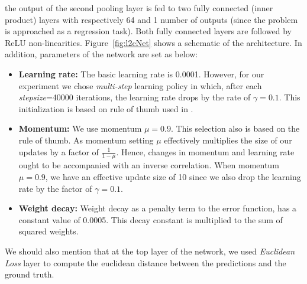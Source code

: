 \noindent the output of the second pooling layer is fed to two fully connected (inner product) layers with respectively 64 and 1 number of outputs (since the problem is approached as a regression task). Both fully connected layers are followed by ReLU non-linearities. Figure~\ref{fig:l2cNet} shows a schematic of the architecture. In addition, parameters of the network are set as below:
\begin{itemize}
\item \textbf{Learning rate:} The basic learning rate is 0.0001. However, for our experiment we chose \textit{multi-step} learning policy in which, after each \textit{stepsize}=40000 iterations, the learning rate drops by the rate of $\gamma = 0.1$. This initialization is based on rule of thumb used in \cite{krizhevsky2012imagenet}.
\item \textbf{Momentum:} We use momentum $\mu = 0.9$. This selection also is based on the rule of thumb. As momentum setting  $\mu$ effectively multiplies the size of our updates by a factor of $\frac{1}{1-\mu}$. Hence, changes in momentum and learning rate ought to be accompanied with an inverse correlation. When momentum $\mu = 0.9$, we have an effective update size of 10 since we also drop the learning rate by the factor of $\gamma= 0.1$.
\item \textbf{Weight decay:} Weight decay as a penalty term to the error function, has a constant value of 0.0005. This decay constant is multiplied to the sum of squared weights.
\end{itemize}

\noindent We should also mention that at the top layer of the network, we used \textit{Euclidean Loss }layer to compute  the euclidean distance between the predictions and the ground truth. 

